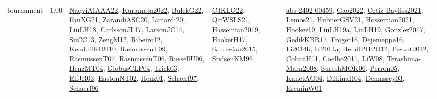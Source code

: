 {\begin{longtable}{p{3cm}r>{\raggedright\arraybackslash}p{6cm}>{\raggedright\arraybackslash}p{6cm}>{\raggedright\arraybackslash}p{8cm}}
\index{tournament}\index{ApplicationAreas!tournament}tournament &  1.00 & \hyperref[detail:NaqviAIAAA22]{NaqviAIAAA22}, \hyperref[detail:Kuramata2022]{Kuramata2022}, \hyperref[detail:BulckG22]{BulckG22}, \hyperref[detail:FanXG21]{FanXG21}, \hyperref[detail:ZarandiASC20]{ZarandiASC20}, \hyperref[detail:Lunardi20]{Lunardi20}, \hyperref[detail:LiuLH18]{LiuLH18}, \hyperref[detail:CarlssonJL17]{CarlssonJL17}, \hyperref[detail:LarsonJC14]{LarsonJC14}, \hyperref[detail:SuCC13]{SuCC13}, \hyperref[detail:ZengM12]{ZengM12}, \hyperref[detail:Ribeiro12]{Ribeiro12}, \hyperref[detail:KendallKRU10]{KendallKRU10}, \hyperref[detail:RasmussenT09]{RasmussenT09}, \hyperref[detail:RasmussenT07]{RasmussenT07}, \hyperref[detail:RasmussenT06]{RasmussenT06}, \hyperref[detail:RussellU06]{RussellU06}, \hyperref[detail:HenzMT04]{HenzMT04}, \hyperref[detail:GlobusCLP04]{GlobusCLP04}, \hyperref[detail:Trick03]{Trick03}, \hyperref[detail:ElfJR03]{ElfJR03}, \hyperref[detail:EastonNT02]{EastonNT02}, \hyperref[detail:Henz01]{Henz01}, \hyperref[detail:Schaerf97]{Schaerf97}, \hyperref[detail:Schaerf96]{Schaerf96} & \hyperref[detail:CilKLO22]{CilKLO22}, \hyperref[detail:QinWSLS21]{QinWSLS21}, \hyperref[detail:Hosseinian2019]{Hosseinian2019}, \hyperref[detail:HookerH17]{HookerH17}, \hyperref[detail:Sahraeian2015]{Sahraeian2015}, \hyperref[detail:StidsenKM96]{StidsenKM96} & \hyperref[detail:abs-2402-00459]{abs-2402-00459}, \hyperref[detail:Gao2022]{Gao2022}, \hyperref[detail:Ortiz-Bayliss2021]{Ortiz-Bayliss2021}, \hyperref[detail:Lemos21]{Lemos21}, \hyperref[detail:HubnerGSV21]{HubnerGSV21}, \hyperref[detail:Hosseinian2021]{Hosseinian2021}, \hyperref[detail:Hooker19]{Hooker19}, \hyperref[detail:LiuLH19a]{LiuLH19a}, \hyperref[detail:LiuLH19]{LiuLH19}, \hyperref[detail:Gonzlez2017]{Gonzlez2017}, \hyperref[detail:GedikKBR17]{GedikKBR17}, \hyperref[detail:Froger16]{Froger16}, \hyperref[detail:Dejemeppe16]{Dejemeppe16}, \hyperref[detail:Li2014b]{Li2014b}, \hyperref[detail:Li2014a]{Li2014a}, \hyperref[detail:RendlPHPR12]{RendlPHPR12}, \hyperref[detail:Pesant2012]{Pesant2012}, \hyperref[detail:CobanH11]{CobanH11}, \hyperref[detail:Coelho2011]{Coelho2011}, \hyperref[detail:LiW08]{LiW08}, \hyperref[detail:Terashima-Marn2008]{Terashima-Marn2008}, \hyperref[detail:SureshMOK06]{SureshMOK06}, \hyperref[detail:Perron05]{Perron05}, \hyperref[detail:KanetAG04]{KanetAG04}, \hyperref[detail:DilkinaH04]{DilkinaH04}, \hyperref[detail:Demassey03]{Demassey03}, \hyperref[detail:EreminW01]{EreminW01}\\

\end{longtable}}

